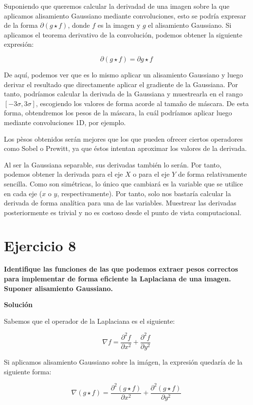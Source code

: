 \documentclass[11pt,a4paper]{article}
\newcommand{\answer}{\noindent\textbf{Solución}}
\newcommand{\question}[1]{\noindent\textbf{#1}}
\newcommand{\nonumbersection}[1]{\section*{#1}\addcontentsline{toc}{section}{#1}}
\begin{document}
Suponiendo que queremos calcular la derivadad de una imagen sobre la que aplicamos alisamiento Gaussiano mediante
convoluciones, esto se podría expresar de la forma $\partial(g \star f)$, donde $f$ es la imagen y $g$ el alisamiento
Gaussiano. Si aplicamos el teorema derivativo de la convolución, podemos obtener la siguiente expresión:

\begin{equation}
	\partial(g \star f) = \partial g \star f
\end{equation}

De aquí, podemos ver que es lo mismo aplicar un alisamiento Gaussiano y luego derivar el resultado que directamente aplicar
el gradiente de la Gaussiana. Por tanto, podríamos calcular la derivada de la Gaussiana y muestrearla en el rango
$[-3\sigma, 3\sigma]$, escogiendo los valores de forma acorde al tamaño de máscara. De esta forma, obtendremos los pesos
de la máscara, la cuál podríamos aplicar luego mediante convoluciones 1D, por ejemplo.

Los pèsos obtenidos serán mejores que los que pueden ofrecer ciertos operadores como Sobel o Prewitt, ya que éstos intentan
aproximar los valores de la derivada.

Al ser la Gaussiana separable, sus derivadas también lo serán. Por tanto, podemos obtener la derivada para el eje $X$ o para
el eje $Y$ de forma relativamente sencilla. Como son simétricas, lo único que cambiará es la variable que se utilice en cada
eje ($x$ o $y$, respectivamente). Por tanto, solo nos bastaría calcular la derivada de forma analítica para una de las variables.
Muestrear las derivadas posteriormente es trivial y no es costoso desde el punto de vista computacional.

\nonumbersection{Ejercicio 8}

\question{Identifique las funciones de las que podemos extraer pesos correctos
para implementar de forma eficiente la Laplaciana de una imagen. Suponer
alisamiento Gaussiano.}

\answer

Sabemos que el operador de la Laplaciana es el siguiente:

\begin{equation}
	\nabla f = \frac{\partial^2f}{\partial x^2} + \frac{\partial^2f}{\partial y^2}
\end{equation}

Si aplicamos alisamiento Gaussiano sobre la imágen, la expresión quedaría de la siguiente forma:

\begin{equation}
\label{eq:laplacian-gaussian}
	\nabla (g \star f) = \frac{\partial^2(g \star f)}{\partial x^2} + \frac{\partial^2(g \star f)}{\partial y^2}
\end{equation}
\end{document}
